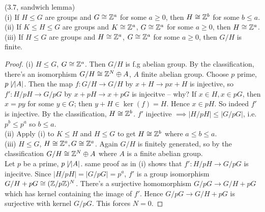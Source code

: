 \documentclass[a4paper]{article}
\begin{document}
\begin{lemma} (3.7, sandwich lemma)\\
(i) If $H \leq G$ are groups and $G \cong \mathbb{Z}^a$ for some $a \geq 0$, then $H \cong \mathbb{Z}^b$ for some $b \leq a$.\\
(ii) If $K \leq H \leq G$ are groups and $K \cong \mathbb{Z}^a$, $G \cong \mathbb{Z}^a$ for some $a \geq 0$, then $H \cong \mathbb{Z}^a$.\\
(iii) If $H \leq G$ are groups and $H \cong \mathbb{Z}^a$, $G \cong \mathbb{Z}^a$ for some $a \geq 0$, then $G/H$ is finite.
\begin{proof}
(i) $H \leq G$, $G \cong \mathbb{Z}^a$. Then $G/H$ is f.g abelian group. By the classification, there's an isomorphism $G/H \cong \mathbb{Z}^N \oplus A$, $A$ finite abelian group. Choose $p$ prime, $p \not\mid |A|$. Then the map $f:G/H \to G/H$ by $x+H \to px + H$ is injective, so $f':H/pH \to G/pG$ by $x+pH \to x+pG$ is injecitve -- why? If $x \in H, x \in pG$, then $x = py$ for some $y \in G$; then $y+H \in \ker(f) =H$. Hence $x \in pH$. So indeed $f'$ is injective. By the classification, $H \cong \mathbb{Z}^b$. $f'$ injective $\implies |H/pH| \leq |G/pG|$, i.e. $p^b \leq p^a$ so $b\leq a$.\\
(ii) Apply (i) to $K \leq H$ and $H \leq G$ to get $H \cong \mathbb{Z}^b$ where $a\leq b\leq a$.\\
(iii) $H \leq G$, $H \cong \mathbb{Z}^a, G \cong \mathbb{Z}^a$. Again $G/H$ is finitely generated, so by the classification $G/H \cong \mathbb{Z}^N \oplus A$ where $A$ is a finite abelian group.\\
Let $p$ be a prime, $p \not\mid |A|$. same proof as in (i) shows that $f':H/pH \to G/pG$ is injecitve. Since $|H/pH| = |G/pG| = p^a$, $f'$ is a group isomorphism $G/H + pG \cong (\mathbb{Z}/p\mathbb{Z})^N$. There's a surjective homomorphism $G/pG \to G/H+pG$ which has kernel containing the image of $f'$. Hence $G/pG \to G/H + pG$ is surjective with kernel $G/pG$. This forces $N=0$.
\end{proof}
\end{lemma}

\iffalse
\begin{equation*}
\begin{aligned}

\end{aligned}
\end{equation*}
\fi
\end{document}
